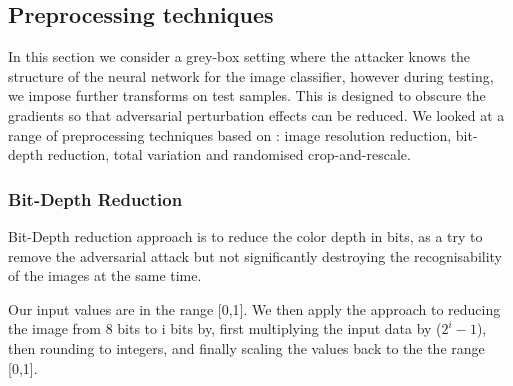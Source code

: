 \subsection{Preprocessing techniques}

In this section we consider a grey-box setting where the attacker knows the structure of the neural network for the image classifier, however during testing, we impose further transforms on test samples. This is designed to obscure the gradients so that adversarial perturbation effects can be reduced. We looked at a range of preprocessing techniques based on \cite{Guo18}: image resolution reduction, bit-depth reduction, total variation and randomised crop-and-rescale.


\subsubsection{Bit-Depth Reduction} %
Bit-Depth reduction approach \cite{DBLP:journals/corr/XuEQ17} is to reduce the color depth in bits, as a try to remove the adversarial attack but not significantly destroying the recognisability of the images at the same time. 

Our input values are in the range [0,1]. We then apply the approach to reducing the image from 8 bits to i bits by, first multiplying the input data by ($2^i - 1$), then rounding to integers, and finally scaling the values back to the the range [0,1].

